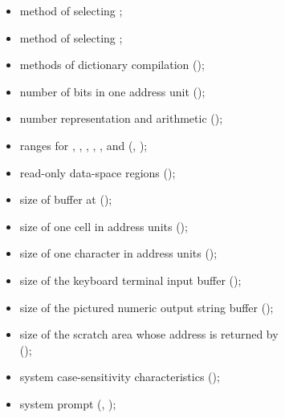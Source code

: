 \begin{itemize}
\item method of selecting ;

\item method of selecting ;

\item methods of dictionary compilation
	();

\item number of bits in one address unit
	();

\item number representation and arithmetic
	();

\item ranges for , , , ,
	, and 
	(,
	 );

\item read-only data-space regions
	();

\item size of buffer at 
	();

\item size of one cell in address units
	();

\item size of one character in address units
	();

\item size of the keyboard terminal input buffer
	();

\item size of the pictured numeric output string buffer 
	();

\item size of the scratch area whose address is returned by
	 \\
	();

\item system case-sensitivity characteristics
	();

\item system prompt (,
	);


\end{itemize}
